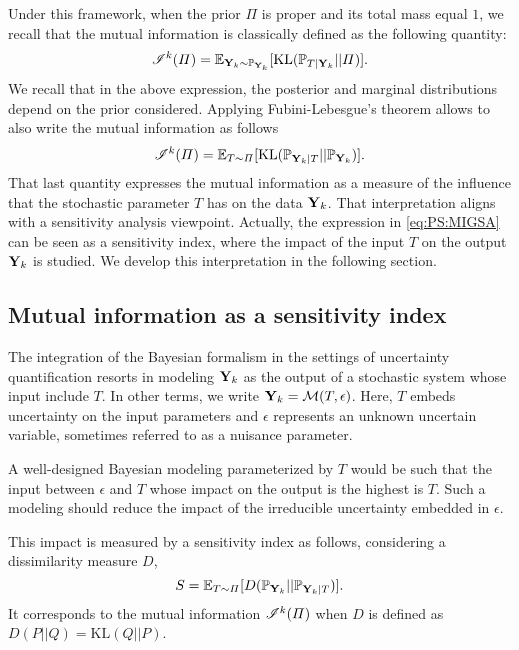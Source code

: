 Under this framework, when the prior $\varPi$ is proper and its total mass equal $1$, we recall that the mutual information is classically defined as the following quantity:
    \begin{equation}
        \mathscr{I}^k(\varPi) =  \mathbb{E}_{\mathbf{Y}_k\sim \mathbb{P}_{\mathbf{Y}_k}}[\text{KL}(\mathbb{P}_{T|\mathbf{Y}_k}||\varPi)] .
    \end{equation}
We recall that in the above expression, the posterior and marginal distributions depend on the prior considered. %
Applying Fubini-Lebesgue's theorem allows to also write the mutual information as follows
    \begin{equation}\label{eq:PS:MIGSA}
        \mathscr{I}^k(\varPi) = \mathbb{E}_{T\sim\varPi}[\text{KL}(\mathbb{P}_{\mathbf{Y}_k|T}||\mathbb{P}_{\mathbf{Y}_k}) ].
    \end{equation}
That last quantity expresses the mutual information as 
a measure of the influence that the stochastic parameter $T$ has on the data $\mathbf{Y}_k$.
That interpretation aligns with a sensitivity analysis viewpoint. Actually, the expression in \cref{eq:PS:MIGSA} can be seen as a sensitivity index, where the impact of the input $T$ on the output $\mathbf{Y}_k$ is studied. We develop this interpretation in the following section.




\subsection{Mutual information as a sensitivity index}

The integration of the Bayesian formalism in the settings of uncertainty quantification resorts in modeling $\mathbf{Y}_k$ as the output of a stochastic system whose input include $T$. In other terms, we write $\mathbf{Y}_k=\mathcal{M}(T,\epsilon)$. Here, $T$ embeds uncertainty on  the input parameters and $\epsilon$ represents an unknown uncertain variable, sometimes referred to as a nuisance parameter.

A well-designed Bayesian modeling parameterized by $T$ would be such that the input between $\epsilon$ and $T$ whose impact on the output
is the highest is $T$. Such a modeling should reduce the impact of the irreducible uncertainty embedded in $\epsilon$.

This impact is measured by a sensitivity index as follows, considering a dissimilarity measure $D$, 
    \begin{equation}
        S = \mathbb{E}_{T\sim\varPi}[ D(\mathbb{P}_{\mathbf{Y}_k}||\mathbb{P}_{\mathbf{Y}_k|T}) ].
    \end{equation}
It corresponds to the mutual information $\mathscr{I}^k(\varPi)$ when $D$ is defined as $D(P||Q)=\text{KL}(Q||P)$.

